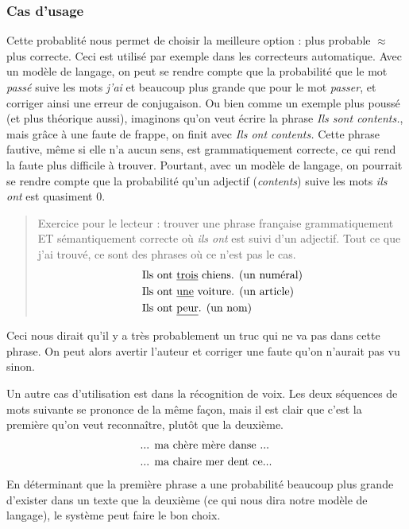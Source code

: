 \documentclass[11pt, a4paper]{report}
\begin{document}
  \subsubsection{Cas d'usage}
  Cette probablité nous permet de choisir la meilleure option : plus probable $\approx$ plus 
  correcte. Ceci est utilisé par exemple dans les correcteurs automatique. Avec un modèle 
  de langage, on peut se rendre compte 
  que la probabilité que le mot \textit{passé} suive les mots \textit{j'ai} et beaucoup plus 
  grande que pour le mot \textit{passer}, et corriger ainsi une erreur de conjugaison. 
  Ou bien comme un exemple plus poussé (et plus théorique aussi), imaginons qu'on veut écrire 
  la phrase \textit{Ils sont contents.}, mais grâce à une faute de frappe, on finit avec 
  \textit{Ils ont contents.} Cette phrase fautive, même si elle n'a aucun sens, est grammatiquement 
  correcte, ce qui rend la faute plus difficile à trouver. Pourtant, avec un modèle de langage, 
  on pourrait se rendre compte que la probabilité qu'un adjectif (\textit{contents}) suive 
  les mots \textit{ils ont} est quasiment 0. 
  \begin{quote}
    Exercice pour le lecteur : trouver une phrase 
    française grammatiquement ET sémantiquement correcte où \textit{ils ont} est suivi d'un 
    adjectif. Tout ce que j'ai trouvé, ce sont des phrases où ce n'est pas le cas. 
    \begin{align*}
      &\textup{Ils ont \underline{trois} chiens. (un numéral)}\\
      &\textup{Ils ont \underline{une} voiture. (un article)}\\
      &\textup{Ils ont \underline{peur}. (un nom)}
    \end{align*}
  \end{quote} 
  Ceci nous dirait qu'il y a très probablement un truc qui ne va pas dans cette phrase. 
  On peut alors avertir l'auteur et corriger une faute qu'on n'aurait pas vu sinon. 

  Un autre cas d'utilisation est dans la récognition de voix. Les deux séquences de mots
  suivante se prononce de la même façon, mais il est clair que c'est la première qu'on veut 
  reconnaître, plutôt que la deuxième. 
  \begin{align*}
    &\textup{... ma chère mère danse ...}\\
    &\textup{... ma chaire mer dent ce}...\\
  \end{align*}
  En déterminant que la première phrase a une probabilité beaucoup plus grande d'exister 
  dans un texte que la deuxième (ce qui nous dira notre modèle de langage), 
  le système peut faire le bon choix. 
\end{document}
